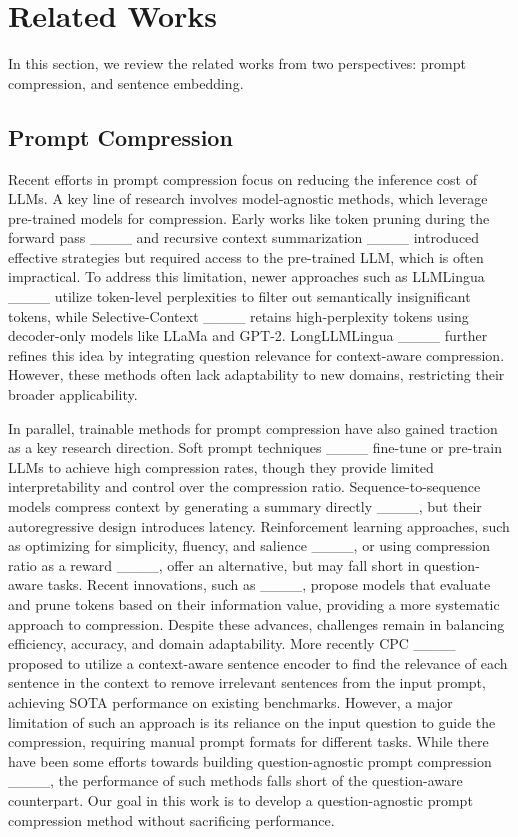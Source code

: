 \section{Related Works}
In this section, we review the related works from two perspectives: prompt compression, and sentence embedding. 

\subsection{Prompt Compression}

Recent efforts in prompt compression focus on reducing the inference cost of LLMs. A key line of research involves model-agnostic methods, which leverage pre-trained models for compression. Early works like token pruning during the forward pass ____ and recursive context summarization ____ introduced effective strategies but required access to the pre-trained LLM, which is often impractical. To address this limitation, newer approaches such as LLMLingua ____ utilize token-level perplexities to filter out semantically insignificant tokens, while Selective-Context ____ retains high-perplexity tokens using decoder-only models like LLaMa and GPT-2. LongLLMLingua ____ further refines this idea by integrating question relevance for context-aware compression. However, these methods often lack adaptability to new domains, restricting their broader applicability.


In parallel, trainable methods for prompt compression have also gained traction as a key research direction. Soft prompt techniques ____ fine-tune or pre-train LLMs to achieve high compression rates, though they provide limited interpretability and control over the compression ratio. Sequence-to-sequence models compress context by generating a summary directly ____, but their autoregressive design introduces latency. Reinforcement learning approaches, such as optimizing for simplicity, fluency, and salience ____, or using compression ratio as a reward ____, offer an alternative,  but may fall short in question-aware tasks. Recent innovations, such as ____, propose models that evaluate and prune tokens based on their information value, providing a more systematic approach to compression. Despite these advances, challenges remain in balancing efficiency, accuracy, and domain adaptability. More recently CPC ____ proposed to utilize a context-aware sentence encoder to find the relevance of each sentence in the context to remove irrelevant sentences from the input prompt, achieving SOTA performance on existing benchmarks. However, a major limitation of such an approach is its reliance on the input question to guide the compression, requiring manual prompt formats for different tasks. While there have been some efforts towards building question-agnostic prompt compression ____, the performance of such methods falls short of the question-aware counterpart. Our goal in this work is to develop a question-agnostic prompt compression method without sacrificing performance.





